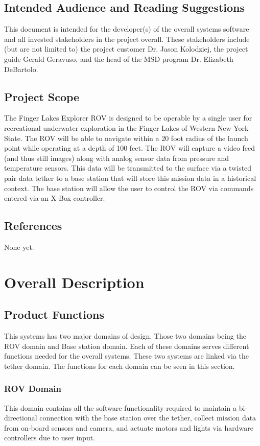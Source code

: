 \documentclass{scrreprt}
\begin{document}
\section{Intended Audience and Reading Suggestions}
This document is intended for the developer(s) of the overall systems software and all invested stakeholders in the project overall. These stakeholders include (but are not limited to) the project customer Dr. Jason Kolodziej, the project guide Gerald Geravuso, and the head of the MSD program Dr. Elizabeth DeBartolo. 

\section{Project Scope}
The Finger Lakes Explorer ROV is designed to be operable by a single user for recreational underwater exploration in the Finger Lakes of Western New York State. The ROV will be able to navigate within a 20 foot radius of the launch point while operating at a depth of 100 feet. The ROV will capture a video feed (and thus still images) along with analog sensor data from pressure and temperature sensors. This data will be transmitted to the surface via a twisted pair data tether to a base station that will store this mission data in a historical context. The base station will allow the user to control the ROV via commands entered via an X-Box controller. 

\section{References}
None yet.


\chapter{Overall Description}


\section{Product Functions}
This systems has two major domains of design. Those two domains being the ROV domain and Base station domain. Each of these domains serves different functions needed for the overall systems. These two systems are linked via the tether domain. The functions for each domain can be seen in this section. 

\subsection{ROV Domain}
This domain contains all the software functionality required to maintain a bi-directional connection with the base station over the tether, collect mission data from on-board sensors and camera, and actuate motors and lights via hardware controllers due to user input.
\end{document}
